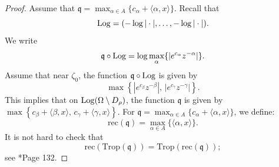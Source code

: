 \documentclass[11pt]{amsart}
\def\Log{{\rm Log}}
\theoremstyle{definition}
\newcommand{\fq}{\mathfrak{q}}
\newcommand{\Trop}{\mathrm{Trop}}
\begin{document}
\begin{proof}
Assume that \(\fq = \max_{\alpha \in A} \{ c_{\alpha} + \langle \alpha, x \rangle \}\). Recall that
\[
\Log = (-\log |\cdot|, \dots, -\log |\cdot|).
\]
We write
\[
\fq \circ \Log = \log \max_{\alpha} \{ |e^{c_{\alpha}} z^{-\alpha}| \}.
\]
Assume that near \(\zeta_0\), the function \(\fq \circ \Log\) is given by
\[
\max \left\{ |e^{c_{\beta}} z^{-\beta}|,\, |e^{c_{\gamma}} z^{-\gamma}| \right\}.
\]
This implies that on \(\Log(\Omega \setminus D_{\rho})\), the function \(\fq\) is given by
\(\max \left\{ c_{\beta} + \langle \beta, x \rangle,\, c_{\gamma} + \langle \gamma, x \rangle \right\}.\)
For \(\fq = \max_{\alpha \in A} \{ c_{\alpha} + \langle \alpha, x \rangle \}\), we define:
\[
\mathrm{rec}(\fq) = \max_{\alpha \in A} \{ \langle \alpha, x \rangle \}.
\]
It is not hard to check that
\[
\mathrm{rec} \left( \Trop(\fq) \right) = \Trop \left( \mathrm{rec}(\fq) \right);
\]
see \cite{Maclagan-Sturmfels}*{Page 132}.

\vskip 2mm


\end{proof}
\end{document}
